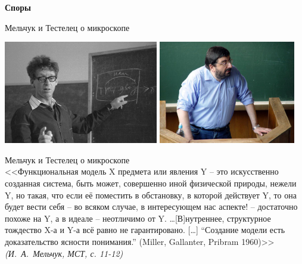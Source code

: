 \documentclass{beamer}
\begin{document}
\begin{frame}{}
\begin{center}
	\textbf{Споры}
\end{center}
\end{frame}

\begin{frame}{Мельчук и Тестелец о микроскопе}
\begin{center}
        \includegraphics[width=0.506\textwidth]{melcuk.jpg}
        \hfill
        \includegraphics[width=0.45\textwidth]{testelets.jpg}
\end{center}
\end{frame}

\begin{frame}{Мельчук и Тестелец о микроскопе}
\ \\
{\small <<Функциональная модель X предмета или явления Y -- это искусственно созданная система, быть может, совершенно иной физической природы, нежели Y, но такая, что если её поместить в обстановку, в которой действует Y, то она будет вести себя -- во всяком случае, в интересующем нас аспекте! -- достаточно похоже на Y, а в идеале -- неотличимо от Y. \dots [В]нутреннее, структурное тождество X-а и Y-а всё равно не гарантировано. [\dots] ``Создание модели есть доказательство ясности понимания.'' (Miller, Gallanter, Pribram 1960)>> \textit{(И.~А.~Мельчук, МСТ, с. 11-12)}}\\
\end{frame}
\end{document}

